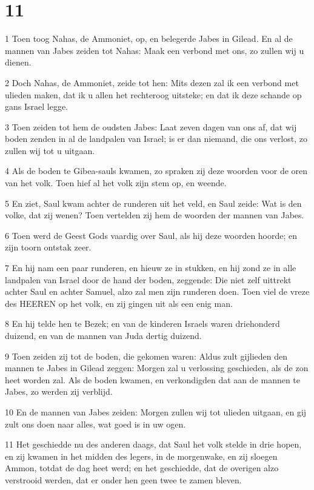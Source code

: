 \chapter{11}

\par 1 Toen toog Nahas, de Ammoniet, op, en belegerde Jabes in Gilead. En al de mannen van Jabes zeiden tot Nahas: Maak een verbond met ons, zo zullen wij u dienen.
\par 2 Doch Nahas, de Ammoniet, zeide tot hen: Mits dezen zal ik een verbond met ulieden maken, dat ik u allen het rechteroog uitsteke; en dat ik deze schande op gans Israel legge.
\par 3 Toen zeiden tot hem de oudsten Jabes: Laat zeven dagen van ons af, dat wij boden zenden in al de landpalen van Israel; is er dan niemand, die ons verlost, zo zullen wij tot u uitgaan.
\par 4 Als de boden te Gibea-sauls kwamen, zo spraken zij deze woorden voor de oren van het volk. Toen hief al het volk zijn stem op, en weende.
\par 5 En ziet, Saul kwam achter de runderen uit het veld, en Saul zeide: Wat is den volke, dat zij wenen? Toen vertelden zij hem de woorden der mannen van Jabes.
\par 6 Toen werd de Geest Gods vaardig over Saul, als hij deze woorden hoorde; en zijn toorn ontstak zeer.
\par 7 En hij nam een paar runderen, en hieuw ze in stukken, en hij zond ze in alle landpalen van Israel door de hand der boden, zeggende: Die niet zelf uittrekt achter Saul en achter Samuel, alzo zal men zijn runderen doen. Toen viel de vreze des HEEREN op het volk, en zij gingen uit als een enig man.
\par 8 En hij telde hen te Bezek; en van de kinderen Israels waren driehonderd duizend, en van de mannen van Juda dertig duizend.
\par 9 Toen zeiden zij tot de boden, die gekomen waren: Aldus zult gijlieden den mannen te Jabes in Gilead zeggen: Morgen zal u verlossing geschieden, als de zon heet worden zal. Als de boden kwamen, en verkondigden dat aan de mannen te Jabes, zo werden zij verblijd.
\par 10 En de mannen van Jabes zeiden: Morgen zullen wij tot ulieden uitgaan, en gij zult ons doen naar alles, wat goed is in uw ogen.
\par 11 Het geschiedde nu des anderen daags, dat Saul het volk stelde in drie hopen, en zij kwamen in het midden des legers, in de morgenwake, en zij sloegen Ammon, totdat de dag heet werd; en het geschiedde, dat de overigen alzo verstrooid werden, dat er onder hen geen twee te zamen bleven.
